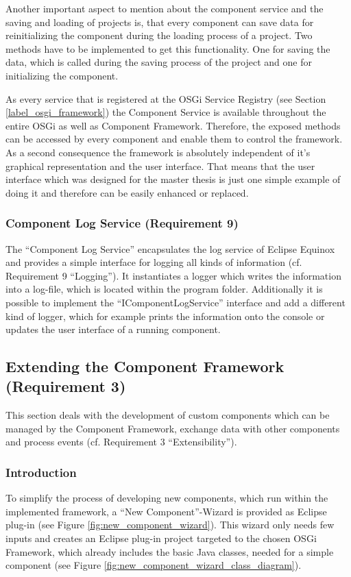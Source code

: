 Another important aspect to mention about the component service and the saving
and loading of projects is, that every component can save data for reinitializing
the component during the loading process of a project. Two methods have to be
implemented to get this functionality. One for saving the data, which is called
during the saving process of the project and one for initializing the component.

As every service that is registered at the OSGi Service Registry (see Section
\ref{label_osgi_framework}) the Component Service is available throughout the entire OSGi as well as
Component Framework. Therefore, the exposed methods can be accessed by every component and enable
them to control the framework. As a second consequence the framework is absolutely independent of it's
graphical representation and the user interface. That means that the user interface which was
designed for the master thesis is just one simple example of doing it and therefore can be easily
enhanced or replaced.

\subsubsection{Component Log Service (Requirement 9)}
The ``Component Log Service'' encapsulates the log service of Eclipse Equinox and provides a simple interface for
logging all kinds of information (cf. Requirement 9 ``Logging''). It instantiates a logger which
writes the information into a log-file, which is located within the program folder. Additionally it is possible to implement
the ``IComponentLogService'' interface and add a different kind of logger, which for example prints
the information onto the console or updates the user interface of a running component.

\subsection{Extending the Component Framework (Requirement 3)}
\label{sec:extensibility}

This section deals with the development of custom components which can be managed by the Component
Framework, exchange data with other components and process events (cf. Requirement 3
``Extensibility'').

\subsubsection{Introduction}
To simplify the process of developing new components, which run within the
implemented framework, a ``New Component''-Wizard is provided as
Eclipse plug-in (see Figure \ref{fig:new_component_wizard}). This wizard only needs few inputs and
creates an Eclipse plug-in project targeted to the chosen OSGi Framework, which already
includes the basic Java classes, needed for a simple component (see Figure
\ref{fig:new_component_wizard_class_diagram}).

